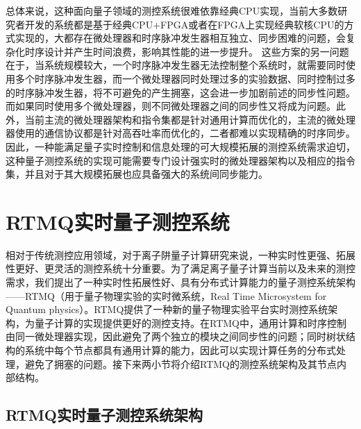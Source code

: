总体来说，这种面向量子领域的测控系统很难依靠经典CPU实现，当前大多数研究者开发的系统都是基于经典CPU+FPGA或者在FPGA上实现经典软核CPU的方式实现的，大都存在微处理器和时序脉冲发生器相互独立、同步困难的问题，会复杂化时序设计并产生时间浪费，影响其性能的进一步提升。
这些方案的另一问题在于，当系统规模较大，一个时序脉冲发生器无法控制整个系统时，就需要同时使用多个时序脉冲发生器，而一个微处理器同时处理过多的实验数据、同时控制过多的时序脉冲发生器，将不可避免的产生拥塞，这会进一步加剧前述的同步性问题。而如果同时使用多个微处理器，则不同微处理器之间的同步性又将成为问题。此外，当前主流的微处理器架构和指令集都是针对通用计算而优化的，主流的微处理器使用的通信协议都是针对高吞吐率而优化的，二者都难以实现精确的时序同步。因此，一种能满足量子实时控制和信息处理的可大规模拓展的测控系统需求迫切，这种量子测控系统的实现可能需要专门设计强实时的微处理器架构以及相应的指令集，并且对于其大规模拓展也应具备强大的系统间同步能力。




\section[RTMQ实时量子测控系统]{RTMQ实时量子测控系统\label{section:rtmq_structure}}

相对于传统测控应用领域，对于离子阱量子计算研究来说，一种实时性更强、拓展性更好、更灵活的测控系统十分重要。为了满足离子量子计算当前以及未来的测控需求，我们提出了一种实时性拓展性好、具有分布式计算能力的量子测控系统架构——RTMQ（用于量子物理实验的实时微系统，Real Time Microsystem for Quantum physics）。RTMQ提供了一种新的量子物理实验平台实时测控系统架构，为量子计算的实现提供更好的测控支持。在RTMQ中，通用计算和时序控制由同一微处理器实现，因此避免了两个独立的模块之间同步性的问题；同时树状结构的系统中每个节点都具有通用计算的能力，因此可以实现计算任务的分布式处理，避免了拥塞的问题\cite[]{junhua01}。接下来两小节将介绍RTMQ的测控系统架构及其节点内部结构。


\subsection[RTMQ实时量子测控系统架构]{RTMQ实时量子测控系统架构\label{section:rtmq_architecture}}

